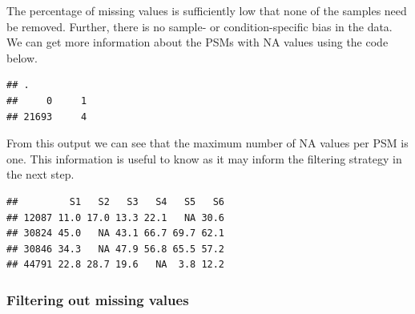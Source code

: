 \documentclass[9pt,a4paper,]{extarticle}
\newenvironment{Shaded}{\begin{snugshade}}{\end{snugshade}}
\newcommand{\DecValTok}[1]{\textcolor[rgb]{0.00,0.00,0.81}{#1}}
\newcommand{\DocumentationTok}[1]{\textcolor[rgb]{0.56,0.35,0.01}{\textbf{\textit{#1}}}}
\newcommand{\FunctionTok}[1]{\textcolor[rgb]{0.13,0.29,0.53}{\textbf{#1}}}
\newcommand{\NormalTok}[1]{#1}
\newcommand{\OtherTok}[1]{\textcolor[rgb]{0.56,0.35,0.01}{#1}}
\newcommand{\SpecialCharTok}[1]{\textcolor[rgb]{0.81,0.36,0.00}{\textbf{#1}}}
\newcommand{\StringTok}[1]{\textcolor[rgb]{0.31,0.60,0.02}{#1}}
\begin{document}
The percentage of missing values is sufficiently low that none of the samples
need be removed. Further, there is no sample- or condition-specific bias in the
data. We can get more information about the PSMs with NA values using the code
below.

\begin{Shaded}
\end{Shaded}

\begin{verbatim}
## .
##     0     1 
## 21693     4
\end{verbatim}

From this output we can see that the maximum number of NA values per PSM is one.
This information is useful to know as it may inform the filtering strategy in the
next step.

\begin{Shaded}
\end{Shaded}

\begin{verbatim}
##         S1   S2   S3   S4   S5   S6
## 12087 11.0 17.0 13.3 22.1   NA 30.6
## 30824 45.0   NA 43.1 66.7 69.7 62.1
## 30846 34.3   NA 47.9 56.8 65.5 57.2
## 44791 22.8 28.7 19.6   NA  3.8 12.2
\end{verbatim}

\hypertarget{filtering-out-missing-values}{%
\subsubsection{Filtering out missing values}\label{filtering-out-missing-values}}
\end{document}
